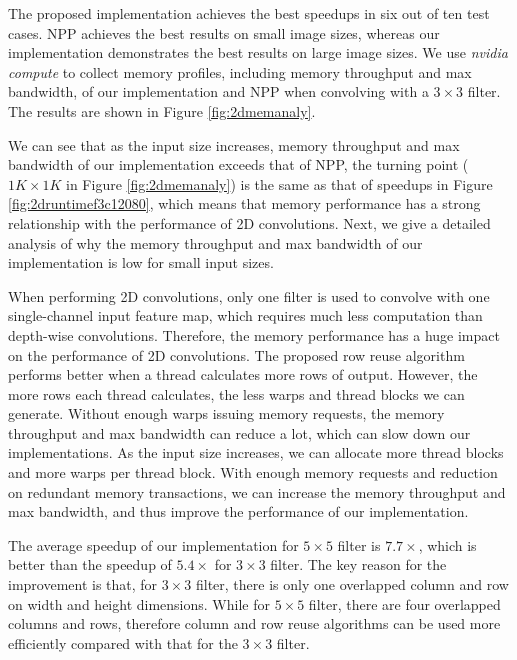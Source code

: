 The proposed implementation achieves the best speedups in six out of ten test cases. NPP achieves the best results on small image sizes, whereas our implementation demonstrates the best results on large image sizes. We use \emph{nvidia compute} to collect memory profiles, including memory throughput and max bandwidth, of our implementation and NPP when convolving with a $3 \times 3$ filter. The results are shown in Figure \ref{fig:2dmemanaly}.

We can see that as the input size increases, memory throughput and max bandwidth of our implementation exceeds that of NPP, the turning point ($1K \times 1K$ in Figure \ref{fig:2dmemanaly}) is the same as that of speedups in Figure \ref{fig:2druntimef3c12080}, which means that memory performance has a strong relationship with the performance of 2D convolutions. Next, we give a detailed analysis of why the memory throughput and max bandwidth of our implementation is low for small input sizes.

When performing 2D convolutions, only one filter is used to convolve with one single-channel input feature map, which requires much less computation than depth-wise convolutions. Therefore, the memory performance has a huge impact on the performance of 2D convolutions. The proposed row reuse algorithm performs better when a thread calculates more rows of output. However, the more rows each thread calculates, the less warps and thread blocks we can generate. Without enough warps issuing memory requests, the memory throughput and max bandwidth can reduce a lot, which can slow down our implementations. As the input size increases, we can allocate more thread blocks and more warps per thread block. With enough memory requests and reduction on redundant memory transactions, we can increase the memory throughput and max bandwidth, and thus improve the performance of our implementation.

The average speedup of our implementation for $5 \times 5$ filter is $7.7\times$, which is better than the speedup of $5.4\times$ for $3 \times 3$ filter. The key reason for the improvement is that, for $3 \times 3$ filter, there is only one overlapped column and row on width and height dimensions. While for $5 \times 5$ filter, there are four overlapped columns and rows, therefore column and row reuse algorithms can be used more efficiently compared with  that for the $3 \times 3$ filter.


